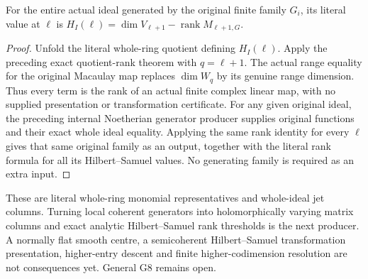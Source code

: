 \begin{theorem}
\label{hir:actual-hilbert-samuel-macaulay-rank}
\leanok
{}
For the entire actual ideal generated by the original finite family $G_i$,
its literal value at $\ell$ is
$H_I(\ell)=\dim V_{\ell+1}-\operatorname{rank}M_{\ell+1,G}$.
\end{theorem}
\begin{proof}
Unfold the literal whole-ring quotient defining $H_I(\ell)$.
Apply the preceding exact quotient-rank theorem with $q=\ell+1$.
The actual range equality for the original Macaulay map replaces
$\dim W_q$ by its genuine range dimension. Thus every term is the rank
of an actual finite complex linear map, with no supplied presentation
or transformation certificate. For any given original ideal, the preceding internal Noetherian generator
producer supplies original functions and their exact whole ideal equality.
Applying the same rank identity for every $\ell$ gives that same original
family as an output, together with the literal rank formula for all its
Hilbert--Samuel values. No generating family is required as an extra input.
\end{proof}

\begin{remark}
These are literal whole-ring monomial representatives and whole-ideal jet
columns. Turning local coherent generators into holomorphically varying matrix
columns and exact analytic Hilbert--Samuel rank thresholds is the next producer. A normally
flat smooth centre, a semicoherent Hilbert--Samuel transformation
presentation, higher-entry descent and finite higher-codimension resolution
are not consequences yet. General G8 remains open.
\end{remark}
